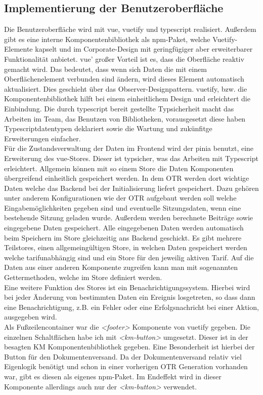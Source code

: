 \subsection{Implementierung der Benutzeroberfläche}
\label{oberflacheimplemetieren}
Die Benutzeroberfläche wird mit \gls{vue}, \gls{vuetify} und \gls{typescript} realisiert. Außerdem gibt es eine interne Komponentenbibliothek als \gls{npm}-Paket, welche Vuetify-Elemente kapselt und im Corporate-Design mit geringfügiger aber erweiterbarer Funktionalität anbietet. \gls{vue}' großer Vorteil ist es, dass die Oberfläche reaktiv gemacht wird. Das bedeutet, dass wenn sich Daten die mit einem Oberflächenelement verbunden sind ändern, wird dieses Element automatisch aktualisiert. Dies geschieht über das Observer-Designpattern. \gls{vuetify}, bzw. die Komponentenbibliothek hilft bei einem einheitlichem Design und erleichtert die Einbindung. Die durch \gls{typescript} bereit gestellte Typsicherheit macht das Arbeiten im Team, das Benutzen von Bibliotheken, vorausgesetzt diese haben Typescriptdatentypen deklariert sowie die Wartung und zukünfitge Erweiterungen einfacher.\\
Für die Zustandsverwaltung der Daten im Frontend wird der \gls{pinia} benutzt, eine Erweiterung des \gls{vue}-Stores. Dieser ist typsicher, was das Arbeiten mit Typescript erleichtert. Allgemein können mit so einem Store die Daten Komponenten übergreifend einheitlich gespeichert werden. In dem \ac{OTR} werden dort wichtige Daten welche das Backend bei der Initialisierung liefert gespeichert. Dazu gehören unter anderem Konfigurationen wie der \ac{OTR} aufgebaut werden soll welche Eingabemöglichkeiten gegeben sind und eventuelle Sitzungsdaten, wenn eine bestehende Sitzung geladen wurde. Außerdem werden berechnete Beiträge sowie eingegebene Daten gespeichert. Alle eingegebenen Daten werden automatisch beim Speichern im Store gleichzeitig ans Backend geschickt. Es gibt mehrere Teilstores, einen allgemeingültigen Store, in welchen Daten gespeichert werden welche tarifunabhängig sind und ein Store für den jeweilig aktiven Tarif. Auf die Daten aus einer anderen Komponente zugreifen kann man mit sogenannten Gettermethoden, welche im Store definiert werden.\\
Eine weitere Funktion des Stores ist ein Benachrichtigungssystem. Hierbei wird bei jeder Änderung von bestimmten Daten ein Ereignis losgetreten, so dass dann eine Benachrichtigung, z.B. ein Fehler oder eine Erfolgsnachricht bei einer Aktion, ausgegeben wird.\\
Als Fußzeilencontainer war die \textit{<footer>} Komponente von \gls{vuetify} gegeben. Die einzelnen Schaltflächen habe ich mit \textit{<km-button>} umgesetzt. Dieser ist in der besagten \ac{KM} Komponentenbibliothek gegeben. Eine Besonderheit ist hierbei der Button für den Dokumentenversand. Da der Dokumentenversand relativ viel Eigenlogik benötigt und schon in einer vorherigen \ac{OTR} Generation vorhanden war, gibt es diesen als eigenes \gls{npm}-Paket. Im Endeffekt wird in dieser Komponente allerdings auch nur der \textit{<km-button>} verwendet.\\

